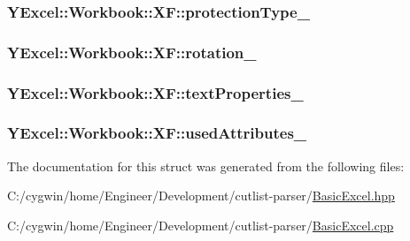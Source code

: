 \subsubsection[{protection\+Type\+\_\+}]{ Y\+Excel\+::\+Workbook\+::\+X\+F\+::protection\+Type\+\_\+}\label{struct_y_excel_1_1_workbook_1_1_x_f_a94dfcf5f9c98f41d3c10bed7313b366c}
\hypertarget{struct_y_excel_1_1_workbook_1_1_x_f_ab7f22b4209243ebf64b26ca6ed2691b1}{}
\subsubsection[{rotation\+\_\+}]{ Y\+Excel\+::\+Workbook\+::\+X\+F\+::rotation\+\_\+}\label{struct_y_excel_1_1_workbook_1_1_x_f_ab7f22b4209243ebf64b26ca6ed2691b1}
\hypertarget{struct_y_excel_1_1_workbook_1_1_x_f_abe310d5e47216d8df3712b2b285aba90}{}
\subsubsection[{text\+Properties\+\_\+}]{ Y\+Excel\+::\+Workbook\+::\+X\+F\+::text\+Properties\+\_\+}\label{struct_y_excel_1_1_workbook_1_1_x_f_abe310d5e47216d8df3712b2b285aba90}
\hypertarget{struct_y_excel_1_1_workbook_1_1_x_f_ad6ad1b9da6929c592ee3047f7b741ffe}{}
\subsubsection[{used\+Attributes\+\_\+}]{ Y\+Excel\+::\+Workbook\+::\+X\+F\+::used\+Attributes\+\_\+}\label{struct_y_excel_1_1_workbook_1_1_x_f_ad6ad1b9da6929c592ee3047f7b741ffe}


The documentation for this struct was generated from the following files\+:\begin{DoxyCompactItemize}
\item 
C\+:/cygwin/home/\+Engineer/\+Development/cutlist-\/parser/\hyperlink{_basic_excel_8hpp}{Basic\+Excel.\+hpp}\item 
C\+:/cygwin/home/\+Engineer/\+Development/cutlist-\/parser/\hyperlink{_basic_excel_8cpp}{Basic\+Excel.\+cpp}\end{DoxyCompactItemize}
